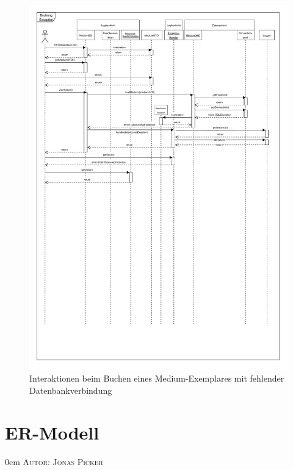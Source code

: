 \documentclass{article}
\makeatletter
\newcommand{\sectionauthor}[1]{
	{\parindent 0em \large \scshape Autor: #1 \par \nobreak \vspace*{1em}}
	\@afterheading
}
\makeatother
\begin{document}
\restoregeometry
\newpage


\begin{figure}[h]
    \centering
    \includegraphics[width = 50em]{Sequenzdiagramm-exception-v3}
    \caption{Interaktionen beim Buchen eines Medium-Exemplares mit fehlender Datenbankverbindung}
    \label{Sequenzdiagramm}
\end{figure}

\restoregeometry
\newpage

\section{ER-Modell}
\sectionauthor{Jonas Picker}
\end{document}
